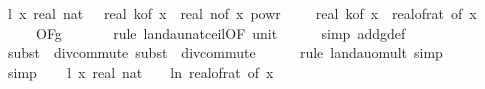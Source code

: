 \begin{isabellebody}
\ l{}{\isacharcolon}{\kern0pt}\ {\isachardoublequoteopen}{\isacharparenleft}{\kern0pt}{\isasymlambda}x{\isachardot}{\kern0pt}\ real\ {\isacharparenleft}{\kern0pt}nat\ {\isasymlceil}{}\ {\isacharasterisk}{\kern0pt}\ real\ {\isacharparenleft}{\kern0pt}k{\isacharunderscore}{\kern0pt}of\ x{\isacharparenright}{\kern0pt}\ {\isacharasterisk}{\kern0pt}\ real\ {\isacharparenleft}{\kern0pt}n{\isacharunderscore}{\kern0pt}of\ x{\isacharparenright}{\kern0pt}\ powr\ {\isacharparenleft}{\kern0pt}{}\ {\isacharminus}{\kern0pt}\ {}\ {\isacharslash}{\kern0pt}\ real\ {\isacharparenleft}{\kern0pt}k{\isacharunderscore}{\kern0pt}of\ x{\isacharparenright}{\kern0pt}{\isacharparenright}{\kern0pt}\ {\isacharslash}{\kern0pt}\ {\isacharparenleft}{\kern0pt}real{\isacharunderscore}{\kern0pt}of{\isacharunderscore}{\kern0pt}rat\ {\isacharparenleft}{\kern0pt}{\isasymdelta}{\isacharunderscore}{\kern0pt}of\ x{\isacharparenright}{\kern0pt}{\isacharparenright}{\kern0pt}\isanewline
\ \ \ \ {\isasymin}\ O{\isacharbrackleft}{\kern0pt}{\isacharquery}{\kern0pt}F{\isacharbrackright}{\kern0pt}{\isacharparenleft}{\kern0pt}g{}{\isacharparenright}{\kern0pt}{\isachardoublequoteclose}\ \isanewline
\ \ \ \ \isamarkupfalse%
\ {\isacharparenleft}{\kern0pt}rule\ landau{\isacharunderscore}{\kern0pt}nat{\isacharunderscore}{\kern0pt}ceil{\isacharbrackleft}{\kern0pt}OF\ unit{\isacharunderscore}{\kern0pt}{}{\isacharbrackright}{\kern0pt}{\isacharparenright}{\kern0pt}\isanewline
\ \ \ \ \isamarkupfalse%
\ {\isacharparenleft}{\kern0pt}simp\ add{\isacharcolon}{\kern0pt}g{}{\isacharunderscore}{\kern0pt}def{\isacharparenright}{\kern0pt}\isanewline
\ \ \ \ \isamarkupfalse%
\ {\isacharparenleft}{\kern0pt}subst\ {\isacharparenleft}{\kern0pt}{}{\isacharparenright}{\kern0pt}\ div{\isacharunderscore}{\kern0pt}commute{\isacharcomma}{\kern0pt}\ subst\ {\isacharparenleft}{\kern0pt}{}{\isacharparenright}{\kern0pt}\ div{\isacharunderscore}{\kern0pt}commute{\isacharparenright}{\kern0pt}\isanewline
\ \ \ \ \isamarkupfalse%
\ {\isacharparenleft}{\kern0pt}rule\ landau{\isacharunderscore}{\kern0pt}o{\isachardot}{\kern0pt}mult{\isacharcomma}{\kern0pt}\ simp{\isacharparenright}{\kern0pt}\isanewline
\ \ \ \ \isamarkupfalse%
\ simp\isanewline
\isanewline
\ \ \isamarkupfalse%
\ l{}{\isacharcolon}{\kern0pt}\ {\isachardoublequoteopen}{\isacharparenleft}{\kern0pt}{\isasymlambda}x{\isachardot}{\kern0pt}\ real\ {\isacharparenleft}{\kern0pt}nat\ {\isasymlceil}{\isacharminus}{\kern0pt}\ {\isacharparenleft}{\kern0pt}{}{}\ {\isacharasterisk}{\kern0pt}\ ln\ {\isacharparenleft}{\kern0pt}real{\isacharunderscore}{\kern0pt}of{\isacharunderscore}{\kern0pt}rat\ {\isacharparenleft}{\kern0pt}{\isasymepsilon}{\isacharunderscore}{\kern0pt}of\ x{\isacharparenright}{\kern0pt}{\isacharparenright}{\kern0pt}{\isacharparenright}{\kern0pt}{\isasymrceil}{\isacharparenright}{\kern0pt}{\isacharparenright}{\kern0pt}\isanewline

\end{isabellebody}
